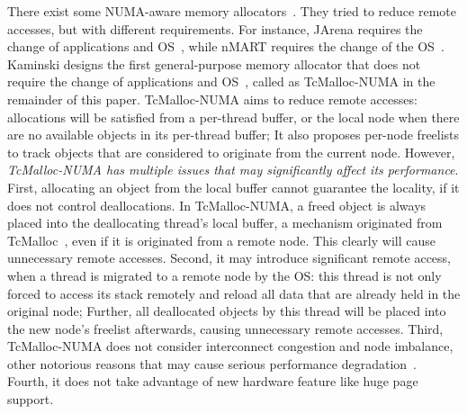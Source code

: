 There exist some NUMA-aware memory allocators~\cite{tcmallocnew, kim2013node, yang2019jarena}. They tried to reduce remote accesses, but with different requirements. For instance, JArena requires the change of applications and OS~\cite{yang2019jarena}, while nMART requires the change of the OS~\cite{kim2013node}.  Kaminski designs the first general-purpose memory allocator that does not require the change of applications and OS~\cite{tcmallocnew}, called as TcMalloc-NUMA in the remainder of this paper. TcMalloc-NUMA aims to reduce remote accesses: allocations will be satisfied from a per-thread buffer, or the local node when there are no available objects in its per-thread buffer; It also proposes per-node freelists to track objects that are considered to originate from the current node. However, \textit{TcMalloc-NUMA has multiple issues that may significantly affect its performance}. First, allocating an object from the local buffer cannot guarantee the locality, if it does not control deallocations. In TcMalloc-NUMA, a freed object is always placed into the deallocating thread's local buffer, a mechanism originated from TcMalloc~\cite{tcmalloc}, even if it is originated from a remote node. This clearly will cause unnecessary remote accesses. %
 Second, it may introduce significant remote access, when a thread is migrated to a remote node by the OS: this thread is not only forced to access its stack remotely and reload all data that are already held in the original node; Further, all deallocated objects by this thread will be placed into the new node's freelist afterwards, causing unnecessary remote accesses. %
 Third, TcMalloc-NUMA does not consider interconnect congestion and node imbalance, other notorious reasons that may cause serious performance degradation~\cite{Blagodurov:2011:CNC:2002181.2002182}. %
 Fourth, it does not take advantage of new hardware feature like huge page support. %

